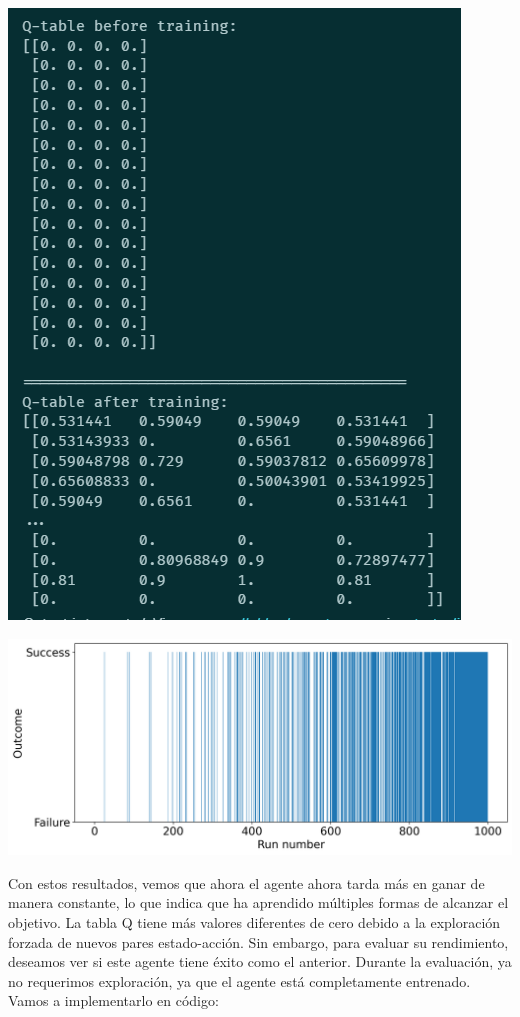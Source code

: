 \documentclass{article}
\begin{document}
\vspace{0.5cm}

\begin{center}
    \includegraphics[width=0.5\linewidth]{trifasico.png}
\end{center}

\vspace{0.5cm}

\begin{center}
    \includegraphics[width=0.75\linewidth]{jurasico.png}
\end{center}

\vspace{0.5cm}

Con estos resultados, vemos que ahora el agente ahora tarda más en ganar de manera constante, lo que indica que ha aprendido múltiples formas de alcanzar el objetivo. La tabla Q tiene más valores diferentes de cero debido a la exploración forzada de nuevos pares estado-acción. Sin embargo, para evaluar su rendimiento, deseamos ver si este agente tiene éxito como el anterior. Durante la evaluación, ya no requerimos exploración, ya que el agente está completamente entrenado. Vamos a implementarlo en código:

\vspace{0.5cm}
\end{document}
